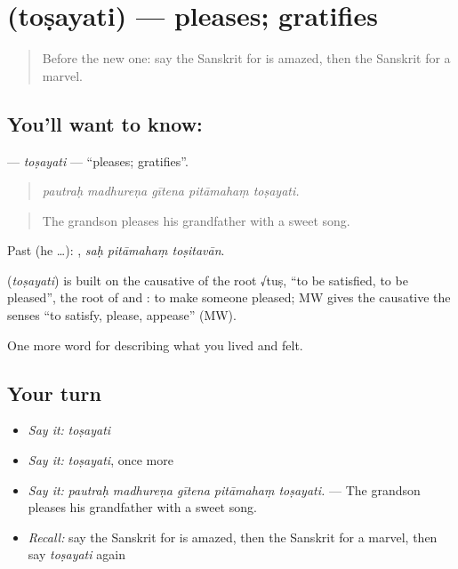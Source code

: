 \section[\texorpdfstring{\sk{तोषयति} (toṣayati)}{तोषयति (toṣayati)}]{ (toṣayati) — pleases; gratifies}

\label{lesson:SA-C449-tosayati}



\begin{quote}
Before the new one: say the Sanskrit for is amazed, then the Sanskrit for a marvel.
\end{quote}

\subsection*{You'll want to know: }
\textbf{} — \emph{toṣayati} — \textquotedblleft{}pleases; gratifies\textquotedblright{}.

\begin{quote}
    
\end{quote}

\begin{quote}
\emph{pautraḥ madhureṇa gītena pitāmahaṃ toṣayati.}
\end{quote}

\begin{quote}
The grandson pleases his grandfather with a sweet song.
\end{quote}

Past (he …):   , \emph{saḥ pitāmahaṃ toṣitavān}.

\begin{cousinweb}
\textbf{} (\emph{toṣayati}) is built on the causative of the root √tuṣ, \textquotedblleft{}to be satisfied, to be pleased\textquotedblright{}, the root of \textbf{} and \textbf{}: to make someone pleased; MW gives the causative the senses \textquotedblleft{}to satisfy, please, appease\textquotedblright{} (MW).
\end{cousinweb}

\begin{grammarlens}[title={What you've built}]
One more word for describing what you lived and felt.
\end{grammarlens}

\subsection*{Your turn}
\begin{itemize}
\raggedright
  \item \emph{Say it:} \emph{toṣayati}
  \item \emph{Say it:} \emph{toṣayati}, once more
  \item \emph{Say it:} \emph{pautraḥ madhureṇa gītena pitāmahaṃ toṣayati.} — The grandson pleases his grandfather with a sweet song.
  \item \emph{Recall:} say the Sanskrit for is amazed, then the Sanskrit for a marvel, then say \emph{toṣayati} again
\end{itemize}

